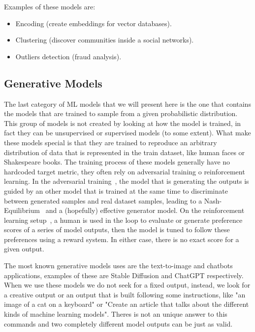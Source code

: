 Examples of these models are:
\begin{itemize}
    \item Encoding (create embeddings for vector databases).
    \item Clustering (discover communities inside a social networks).
    \item Outliers detection (fraud analysis).
\end{itemize}

\subsection{Generative Models}

The last category of ML models that we will present here is the one that contains the models that are trained to sample from a given probabilistic distribution. This group of models is not created by looking at how the model is trained, in fact they can be unsupervised or supervised models (to some extent). What make these models special is that they are trained to reproduce an arbitrary distribution of data that is represented in the train dataset, like human faces or Shakespeare books. The training process of these models generally have no hardcoded target metric, they often rely on adversarial training o reinforcement learning. In the adversarial training~\cite{goodfellow2020generative}, the model that is generating the outputs is guided by an other model that is trained at the same time to discriminate between generated samples and real dataset samples, leading to a Nash-Equilibrium~\cite{nash1950equilibrium} and a (hopefully) effective generator model. On the reinforcement learning setup~\cite{russell2016artificial}, a human is used in the loop to evaluate or generate preference scores of a series of model outputs, then the model is tuned to follow these preferences using a reward system. In either case, there is no exact score for a given output.

The most known generative models uses are the text-to-image and chatbots applications, examples of these are Stable Diffusion and ChatGPT respectively. When we use these models we do not seek for a fixed output, instead, we look for a creative output or an output that is built following some instructions, like "an image of a cat on a keyboard" or "Create an article that talks about the different kinds of machine learning models". Theres is not an unique answer to this commands and two completely different model outputs can be just as valid.

